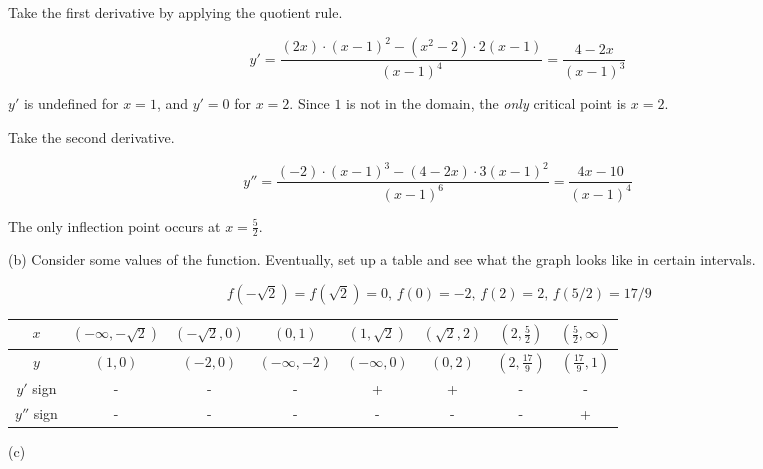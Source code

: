 \documentclass{article}
\begin{document}
\hfill

\noindent Take the first derivative by applying the quotient rule.

\[y' = \frac{(2x)\cdot (x-1)^2 - (x^2-2)\cdot 2(x-1)}{(x-1)^4}=\frac{4-2x}{(x-1)^3}\]

\hfill

\noindent $y'$ is undefined for $x=1$, and $y'=0$ for $x=2$. Since $1$ is not in the domain, the \textit{only} critical point is $x = 2$.

\hfill

\noindent Take the second derivative.

\[y'' = \frac{(-2)\cdot(x-1)^3-(4-2x)\cdot3(x-1)^2 }{(x-1)^6}=\frac{4x-10}{(x-1)^4}\]

\hfill

\noindent The only inflection point occurs at $\displaystyle x=\frac52$.

\hfill

\noindent (b) Consider some values of the function. Eventually, set up a table and see what the graph looks like in certain intervals.

\[\,f\left(-\sqrt2\right)=f\left(\sqrt2\right)=0,\,f(0)=-2,\,f(2)=2,\,f(5/2)=17/9\]

\begin{center}
    \large
    \begin{tabular}{ |c| c c c c c c c| } 
    \hline
        $x$ & $\left(-\infty, -\sqrt2\right)$ & $\left(-\sqrt2, 0\right)$&$\left(0, 1\right)$ & $\left(1,\sqrt2\right)$ & $\left(\sqrt2, 2\right)$ & $\left(2, \frac52\right)$ & $\left(\frac52, \infty\right)$  \\
        \hline
        $y$ & $(1, 0)$ &$(-2,0)$ & $(-\infty, -2)$& $(-\infty, 0)$& $(0, 2)$& $\left(2, \frac{17}9\right)$& $\left(\frac{17}9,1\right)$\\
        \hline
        $y'$ sign &-&-&-&+&+&-&- \\
        \hline
        $y''$ sign &-&-&-&-&-&-&+ \\
        \hline
    \end{tabular}
\end{center}

\hfill

\noindent (c)
\end{document}
